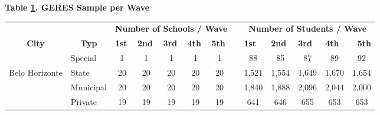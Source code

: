 \documentclass[a4paper, 12pt]{article}
\begin{document}
\begin{table}[H]
  \centering
            \label{table:N_Schools}                        \centering            \textbf{Table \ref{table:N_Schools}. GERES Sample per Wave} \\ 
  \begin{adjustbox}{width=1\textwidth}
    \begin{tabular}{llllllllllllr}
    \toprule
          &       & \multicolumn{5}{c}{\textbf{Number of Schools / Wave}} &       & \multicolumn{5}{c}{\textbf{Number of Students / Wave}} \\
\cmidrule{3-7}\cmidrule{9-13}    \multicolumn{1}{c}{\textbf{City}} & \multicolumn{1}{c}{\textbf{Typ}} & \multicolumn{1}{p{3.445em}}{\textbf{ 1st }} & \multicolumn{1}{p{3.445em}}{\textbf{ 2nd  }} & \multicolumn{1}{p{3.445em}}{\textbf{ 3rd  }} & \multicolumn{1}{p{3.445em}}{\textbf{ 4th  }} & \multicolumn{1}{p{3.445em}}{\textbf{ 5th  }} &       & \multicolumn{1}{p{3.445em}}{\textbf{ 1st }} & \multicolumn{1}{p{3.445em}}{\textbf{ 2nd  }} & \multicolumn{1}{p{3.445em}}{\textbf{ 3rd  }} & \multicolumn{1}{p{3.445em}}{\textbf{ 4th  }} & \multicolumn{1}{p{3.445em}}{\textbf{ 5th  }} \\
\cmidrule{1-7}\cmidrule{9-13}          & Special & \multicolumn{1}{c}{1 } & \multicolumn{1}{c}{1 } & \multicolumn{1}{c}{1 } & \multicolumn{1}{c}{1 } & \multicolumn{1}{c}{1 } &       & \multicolumn{1}{c}{88 } & \multicolumn{1}{c}{85 } & \multicolumn{1}{c}{87 } & \multicolumn{1}{c}{89 } & \multicolumn{1}{c}{92 } \\
    Belo Horizonte & State & \multicolumn{1}{c}{20 } & \multicolumn{1}{c}{20 } & \multicolumn{1}{c}{20 } & \multicolumn{1}{c}{20 } & \multicolumn{1}{c}{20 } &       & \multicolumn{1}{c}{1,521 } & \multicolumn{1}{c}{1,554 } & \multicolumn{1}{c}{1,649 } & \multicolumn{1}{c}{1,670 } & \multicolumn{1}{c}{1,654 } \\
          & Municipal & \multicolumn{1}{c}{20 } & \multicolumn{1}{c}{20 } & \multicolumn{1}{c}{20 } & \multicolumn{1}{c}{20 } & \multicolumn{1}{c}{20 } &       & \multicolumn{1}{c}{1,840 } & \multicolumn{1}{c}{1,888} & \multicolumn{1}{c}{2,096 } & \multicolumn{1}{c}{2,044 } & \multicolumn{1}{c}{2,000 } \\
          & Private & \multicolumn{1}{c}{19 } & \multicolumn{1}{c}{19 } & \multicolumn{1}{c}{19 } & \multicolumn{1}{c}{19 } & \multicolumn{1}{c}{19 } &       & \multicolumn{1}{c}{641 } & \multicolumn{1}{c}{646 } & \multicolumn{1}{c}{655 } & \multicolumn{1}{c}{653 } & \multicolumn{1}{c}{653 } \\

\end{tabular}
\end{adjustbox}
\end{table}
\end{document}
